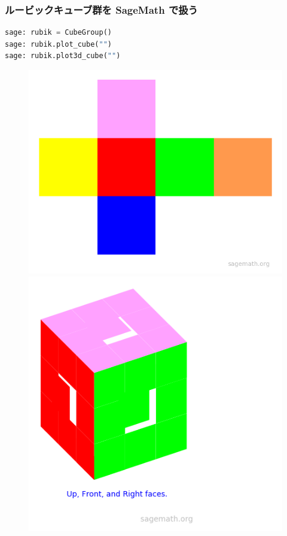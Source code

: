 \documentclass{beamer}
\begin{document}
\begin{frame}[fragile]
    \frametitle{ルービックキューブ群を SageMath で扱う}

    \begin{lstlisting}[language=Python]
sage: rubik = CubeGroup()
sage: rubik.plot_cube("")
sage: rubik.plot3d_cube("")
    \end{lstlisting}

    \begin{figure}
        \includegraphics[scale=0.35]{images/plot_cube.png}
        \includegraphics[scale=0.35]{images/plot3d_cube.png}
    \end{figure}
\end{frame}
\end{document}
